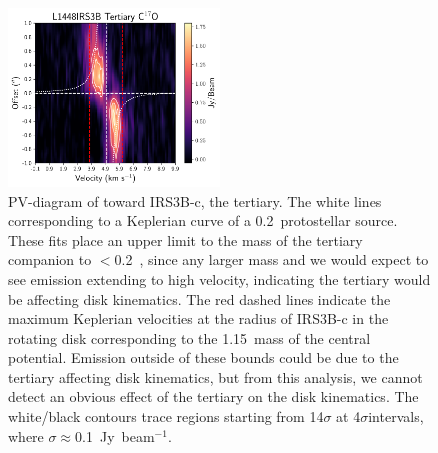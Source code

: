\begin{figure}[H]
\begin{center}
\includegraphics[width=0.5\textwidth]{img/PV-Diagram_L1448IRS3B_C17O_image_taper1500k_image_tertiary31.pdf}
\end{center}
\caption{PV-diagram of \cso\space toward IRS3B-c, the tertiary. The white lines corresponding to a Keplerian curve of a 0.2~\solm\space protostellar source. These fits place an upper limit to the mass of the tertiary companion to $<$0.2~\solm, since any larger mass and we would expect to see emission extending to high velocity, indicating the tertiary would be affecting disk kinematics. The red dashed lines indicate the maximum Keplerian velocities at the radius of IRS3B-c in the rotating disk corresponding to the 1.15~\solm\space mass of the central potential. Emission outside of these bounds could be due to the tertiary affecting disk kinematics, but from this analysis, we cannot detect an obvious effect of the tertiary on the disk kinematics. The white/black contours trace regions starting from 14$\sigma$ at 4$\sigma$\space intervals, where $\sigma\approx$0.1~Jy~beam$^{-1}$.}\label{fig:l1448irs3b_c17o_pv_tert}
\end{figure}



